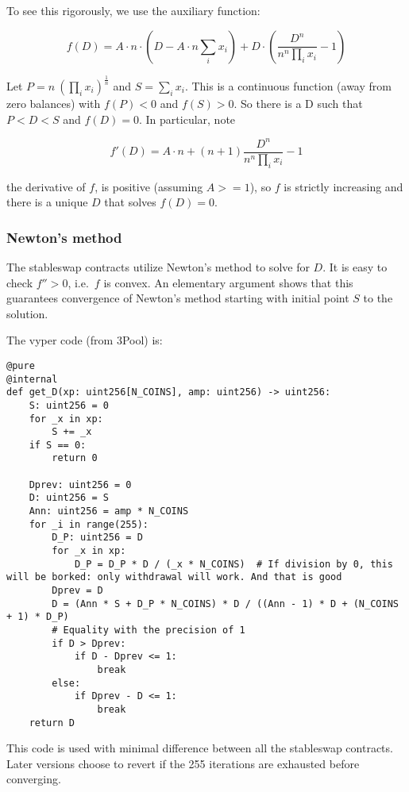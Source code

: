 \documentclass[
]{article}
\begin{document}
To see this rigorously, we use the auxiliary function:

\[ f(D) = A \cdot n \cdot (D - A \cdot n  \sum_i x_i)  + D \cdot (\frac{D^{n}}{n^n \prod_i x_i} - 1) \]

Let \(P = n\ (\prod_i x_i)^{\frac{1}{n}}\) and \(S = \sum_i x_i\). This
is a continuous function (away from zero balances) with \(f(P) < 0\) and
\(f(S) > 0\). So there is a D such that \(P < D < S\) and \(f(D) = 0\).
In particular, note

\[ f'(D) = A\cdot n + (n+1) \frac{D^n}{n^n \prod_i x_i} - 1 \]

the derivative of \(f\), is positive (assuming \(A >= 1\)), so \(f\) is
strictly increasing and there is a unique \(D\) that solves
\(f(D) = 0\).

\hypertarget{newtons-method}{%
\subsubsection{Newton's method}\label{newtons-method}}

The stableswap contracts utilize Newton's method to solve for \(D\). It
is easy to check \(f'' > 0\), i.e.~\(f\) is convex. An elementary
argument shows that this guarantees convergence of Newton's method
starting with initial point \(S\) to the solution.

The vyper code (from 3Pool) is:

\begin{verbatim}
@pure
@internal
def get_D(xp: uint256[N_COINS], amp: uint256) -> uint256:
    S: uint256 = 0
    for _x in xp:
        S += _x
    if S == 0:
        return 0

    Dprev: uint256 = 0
    D: uint256 = S
    Ann: uint256 = amp * N_COINS
    for _i in range(255):
        D_P: uint256 = D
        for _x in xp:
            D_P = D_P * D / (_x * N_COINS)  # If division by 0, this will be borked: only withdrawal will work. And that is good
        Dprev = D
        D = (Ann * S + D_P * N_COINS) * D / ((Ann - 1) * D + (N_COINS + 1) * D_P)
        # Equality with the precision of 1
        if D > Dprev:
            if D - Dprev <= 1:
                break
        else:
            if Dprev - D <= 1:
                break
    return D
\end{verbatim}

This code is used with minimal difference between all the stableswap
contracts. Later versions choose to revert if the 255 iterations are
exhausted before converging.
\end{document}
